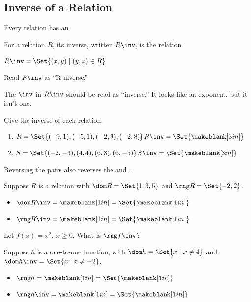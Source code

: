 \subsection{Inverse of a Relation} 
Every relation has an 
\begin{definition}
For a relation $R$, its inverse, written $R\inv$, is the relation
\begin{center}$R\inv=\Set{(x,y)\mid (y,x)\in R}$\end{center}
Read $R\inv$ as ``R inverse.''
\end{definition}
\begin{Note}The ${}\inv$ in $R\inv$ should be read as ``inverse.'' It looks like an exponent, but it isn't one.\end{Note}
\begin{Example} Give the inverse of each relation.
\begin{enumerate}\setabc
\item $R=\Set{(-9,1),(-5,1),(-2,9),(-2,8)}$\lbr$R\inv=\Set{\makeblank[3in]}$
\item $S=\Set{(-2,-3),(4,4),(6,8),(6,-5)}$\lbr$S\inv=\Set{\makeblank[3in]}$
\end{enumerate}
\end{Example}
Reversing the pairs also reverses the \makeblank[1in] and \makeblank[1in].
\begin{Example}
Suppose $R$ is a relation with $\dom R=\Set{1,3,5}$ and $\rng R=\Set{-2,2}$.
\begin{itemize}
\item $\dom R\inv=\makeblank[1in]=\Set{\makeblank[1in]}$
\item $\rng R\inv=\makeblank[1in]=\Set{\makeblank[1in]}$
\end{itemize}
\end{Example}
\begin{Example}
Let $f(x)=x^2,\ x\geq 0$. What is $\rng f\inv$?\makeblanknewf\makeblanknewf
\end{Example}
\begin{Example}
Suppose $h$ is a one-to-one function, with $\dom h=\Set{x\mid x\neq 4}$ and\linebreak$\dom h\inv=\Set{x\mid x\neq -2}$.
\begin{itemize}
\item $\rng h=\makeblank[1in]=\Set{\makeblank[1in]}$
\item $\rng h\inv=\makeblank[1in]=\Set{\makeblank[1in]}$
\end{itemize}
\end{Example}